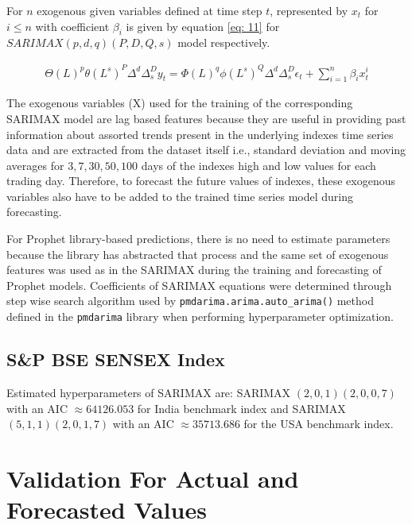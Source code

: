 \documentclass[conference]{IEEEtran}
\begin{document}
For $n$ exogenous given variables defined at time step $t$, represented by $x_{t}$ for $i \leq n$ with coefficient $\beta_{i}$ is given by equation \eqref{eq: 11} for $SARIMAX(p,d,q)(P,D,Q,s)$ model \cite{b17} respectively.

\begin{align}
    \Theta(L)^{p} \theta(L^{s})^{P} \Delta^{d} \Delta_{s}^{D} y_{t} = \Phi(L)^{q} \phi(L^{s})^{Q} \Delta^{d} \Delta_{s}^{D} \epsilon_{t} + \sum_{i=1}^{n} \beta_{i} x^{i}_{t}
    \label{eq: 11}
\end{align}

The exogenous variables (X) used for the training of the corresponding SARIMAX model are lag based features because they are useful in providing past information about assorted trends present in the underlying indexes time series data and are extracted from the dataset itself i.e., standard deviation and moving averages for $3, 7, 30, 50, 100$ days of the indexes high and low values for each trading day. Therefore, to forecast the future values of indexes, these exogenous variables also have to be added to the trained time series model during forecasting.

For Prophet\cite{b7} library-based predictions, there is no need to estimate parameters because the library has abstracted that process and the same set of exogenous features was used as in the SARIMAX during the training and forecasting of Prophet models.
Coefficients of SARIMAX equations were determined through step wise search algorithm used by \texttt{pmdarima.arima.auto_arima()} method defined in the \texttt{pmdarima} library when performing hyperparameter optimization.

\subsection{S\&P BSE SENSEX Index}
Estimated hyperparameters of SARIMAX are: SARIMAX $(2, 0, 1)(2, 0, 0, 7)$ with an AIC $\approx 64126.053$ for India benchmark index and SARIMAX $(5, 1, 1)(2, 0, 1, 7)$ with an AIC $\approx 35713.686$ for the USA benchmark index.

\section{Validation For Actual and Forecasted Values} \label{validation_for_actual_and_forecasted_values}
\end{document}

